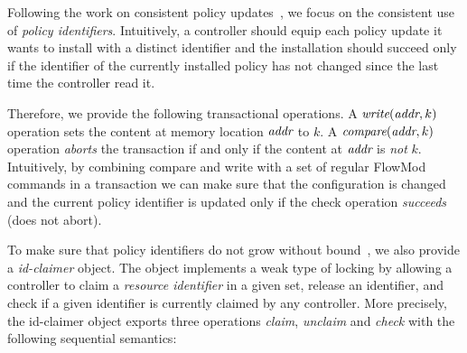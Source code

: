 \documentclass[conference]{sigcomm-alternate}
\newcommand{\claimcheck}{check\xspace}
\newcommand{\compare}{compare\xspace}
\newcommand{\addr}{\emph{addr}\xspace}
\begin{document}
Following the work on consistent policy
updates~\cite{network-update,stn}, we focus on the consistent use of  \emph{policy
identifiers}.
Intuitively, a controller should 
equip each policy update it wants to install with a distinct
identifier
and the installation should succeed only if the identifier of the
currently installed policy has not changed since the last time the
controller read it.
   
Therefore, we provide the following transactional operations.
A $\textit{write}(\addr,k)$ operation sets the content at memory location
$\addr$ to $k$. 
%
%
A $\textit{\compare}(\addr,k)$ operation \emph{aborts} the transaction
if and only if the content at
$\addr$ is \emph{not} $k$.
Intuitively, by combining compare and write with a set of regular
FlowMod commands in a transaction we can make sure that the
configuration is changed and the current policy identifier is updated
only if the check operation \emph{succeeds} (does not abort).      

To make sure that policy identifiers do not grow without bound~\cite{stn}, we
also provide a \emph{id-claimer} object.
The object implements a weak type
of locking by allowing a controller to claim a \emph{resource identifier} in a
given set, release an identifier,  and check if a given identifier
is currently claimed by any controller.
%
More precisely, the id-claimer object exports three operations \emph{claim},
\emph{unclaim} and \emph{\claimcheck} with the following sequential
semantics:
\end{document}
